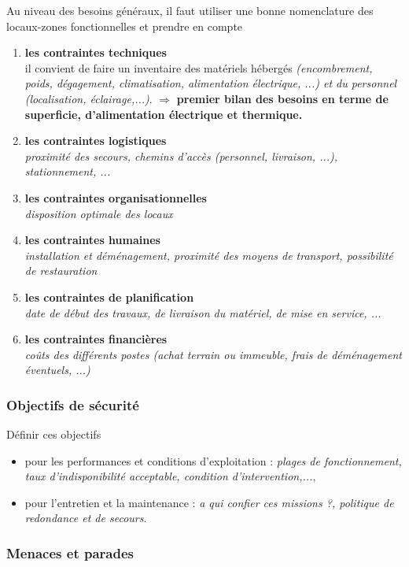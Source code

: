 \documentclass[10pt,a4paper,oneside,titlepage]{report}
\newcommand{\titre}[1]{\textcolor{title}{#1}}
\newcommand{\strong}[1]{\textbf{\titre{#1}}}
\begin{document}
Au niveau des besoins généraux, il faut utiliser une bonne nomenclature des locaux-zones fonctionnelles et prendre en compte
\begin{enumerate}
\item \strong{les contraintes techniques}\\
il convient de faire un inventaire des matériels hébergés  \textit{(encombrement, poids, dégagement, climatisation, alimentation électrique, ...) et du personnel \textit{(localisation, éclairage,...)}}. $\Rightarrow$ \strong{premier bilan des besoins
en terme de superficie, d'alimentation électrique et thermique.}
\item \strong{les contraintes logistiques}\\
\textit{proximité des secours, chemins d'accès (personnel, livraison, ...), stationnement, ...}
\item \strong{les contraintes organisationnelles}\\
\textit{disposition optimale des locaux}
\item \strong{les contraintes humaines}\\
\textit{installation et déménagement, proximité des moyens de transport, possibilité de restauration}
\item \strong{les contraintes de planification}\\
\textit{date de début des travaux, de livraison du matériel, de mise en service, ...}
\item \strong{les contraintes financières}\\
\textit{coûts des différents postes (achat terrain ou immeuble, frais de déménagement éventuels, ...)}
\end{enumerate}

\subsubsection{Objectifs de sécurité}

Définir ces objectifs
\begin{itemize}
\item pour les performances et conditions d'exploitation : \textit{plages de fonctionnement, taux d'indisponibilité acceptable, condition d'intervention,...},
\item pour l'entretien et la maintenance : \textit{a qui confier ces missions ?, politique de redondance et de secours}.
\end{itemize}

\subsubsection{Menaces et parades}
\end{document}
